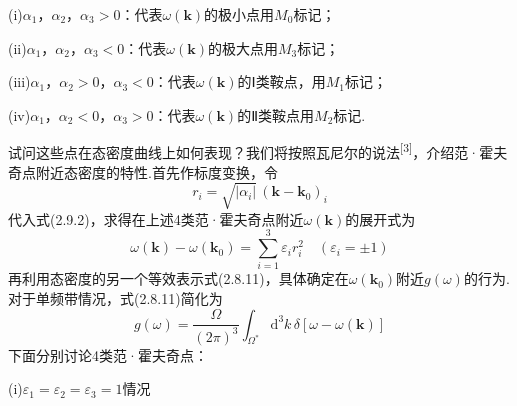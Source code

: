 (i)$\alpha_1$，$\alpha_2$，$\alpha_3>0$：代表$\omega(\boldsymbol{k})$的极小点用$M_0$标记；

(ii)$\alpha_1$，$\alpha_2$，$\alpha_3<0$：代表$\omega(\boldsymbol{k})$的极大点用$M_3$标记；

(iii)$\alpha_1$，$\alpha_2>0$，$\alpha_3<0$：代表$\omega(\boldsymbol{k})$的Ⅰ类鞍点，用$M_1$标记；

(iv)$\alpha_1$，$\alpha_2<0$，$\alpha_3>0$：代表$\omega(\boldsymbol{k})$的Ⅱ类鞍点用$M_2$标记.

试问这些点在态密度曲线上如何表现？我们将按照瓦尼尔的说法\textsuperscript{[3]}，介绍范·霍夫奇点附近态密度的特性.首先作标度变换，令
\begin{equation}
  r_i=\sqrt{|\alpha_i|}\,(\boldsymbol{k}-\boldsymbol{k}_0)_i
\end{equation}
代入式(2.9.2)，求得在上述4类范·霍夫奇点附近$\omega(\boldsymbol{k})$的展开式为
\begin{equation}
  \omega(\boldsymbol{k})-\omega(\boldsymbol{k}_0)
  =\sum_{i=1}^{3}\varepsilon_ir_i^2\quad(\varepsilon_i=\pm1)
\end{equation}
再利用态密度的另一个等效表示式(2.8.11)，具体确定在$\omega(\boldsymbol{k}_0)$附近$g(\omega)$的行为.对于单频带情况，式(2.8.11)简化为
\begin{equation}
  g(\omega)=\frac{\Omega}{(2\pi)^3}\int_{\Omega^{*}}
  \mathrm{d}^3k\,\delta[\omega-\omega(\boldsymbol{k})]
\end{equation}
下面分别讨论4类范·霍夫奇点：

(i)$\varepsilon_1=\varepsilon_2=\varepsilon_3=1$情况


